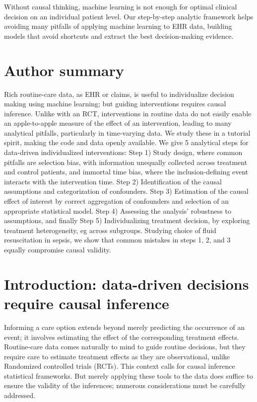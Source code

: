 \documentclass[10pt,letterpaper]{article}
\providecommand{\DIFdelend}{} %
\DeclareRobustCommand{\DIFdelend}{\DIFOaddend \let\includegraphics\DIFOincludegraphics} %
\begin{document}
\DIFdelend Without causal thinking, machine learning is not enough for  optimal clinical decision on an individual patient level. Our step-by-step analytic framework helps avoiding many pitfalls of applying machine learning to EHR data, building models that avoid shortcuts and extract the best decision-making evidence.

\section*{Author summary}

Rich routine-care data, as EHR or claims, is useful to individualize decision
making using machine learning; but guiding interventions requires
causal inference. Unlike with an RCT, interventions in routine data do
not easily enable an apple-to-apple measure of the effect of an
intervention, leading to many analytical pitfalls, particularly in
time-varying data. We study these in a tutorial spirit, making
the code and data openly available. We give 5 analytical steps for
data-driven individualized interventions: Step
1) Study design, where common pitfalls are selection bias, with information
unequally collected across treatment and control patients, and immortal time
bias, where the inclusion-defining event interacts with the
intervention time. Step 2) Identification of the causal assumptions and
categorization of confounders. Step 3) Estimation of the causal effect of
interest by correct aggregation of confounders and selection of an appropriate
statistical model. Step 4) Assessing the
analysis' robustness to assumptions, and finally Step 5) Individualizing
treatment decision, by exploring treatment heterogeneity, eg across subgroups.
Studying choice of fluid resuscitation in sepsis, we show that common
mistakes in steps 1, 2, and 3 equally compromise causal validity.


\linenumbers

\section*{Introduction: data-driven decisions require causal inference}

Informing a care option extends beyond merely predicting the occurrence
of an event; it involves estimating the effect of the corresponding
treatment effects. Routine-care data comes naturally to mind to guide
routine decisions, but they require care to estimate treatment effects as
they are observational, unlike Randomized controlled trials (RCTs). This
context calls for causal inference statistical frameworks.
But merely applying these tools to the data does suffice to ensure the
validity of the inferences; numerous considerations must be carefully addressed.
\end{document}
